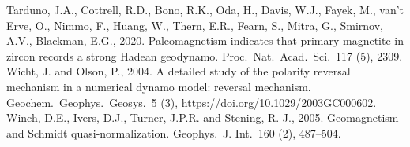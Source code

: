 \begin{thebibliography}{}
%
Tarduno, J.A., Cottrell, R.D., Bono, R.K., Oda, H., Davis, W.J., Fayek, M., van't Erve, O., Nimmo, F., Huang, W., Thern, E.R., Fearn, S., Mitra, G., Smirnov, A.V., Blackman, E.G., 2020. Paleomagnetism indicates that primary magnetite in zircon records a strong Hadean geodynamo. Proc.\ Nat.\ Acad.\ Sci.\ 117 (5), 2309.
%
Wicht, J. and Olson, P., 2004. A detailed study of the polarity reversal mechanism in a numerical dynamo model: reversal mechanism. Geochem.\ Geophys.\ Geosys.\ 5 (3), https://doi.org/10.1029/2003GC000602.
%
Winch, D.E., Ivers, D.J., Turner, J.P.R. and Stening, R. J., 2005. Geomagnetism and Schmidt quasi-normalization. Geophys.\ J. Int.\ 160 (2), 487--504.

\end{thebibliography}